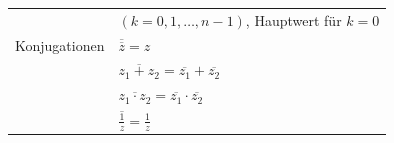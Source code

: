 \documentclass[a4paper]{article}
\begin{document}
\begin{fregeln}[Rechenregeln]
\begin{multicols}{2}
\begin{tabular}{r l}
								& $(k=0,1,\dots,n-1)$, Hauptwert für $k=0$\\
					Konjugationen	&	$\overline{\overline{z}}  = z$\\
										&	$\overline{z_1 + z_2} = \overline{z_1}+ \overline{z_2}$\\
										&	$\overline{z_1 \cdot z_2} = \overline{z_1}\cdot \overline{z_2}$\\
										&	$\overline{\frac{1}{z}} = \frac{1}{z}$
				\end{tabular}
		\end{multicols}
		\vspace{-2.5mm}
	\end{fregeln}
\end{document}

